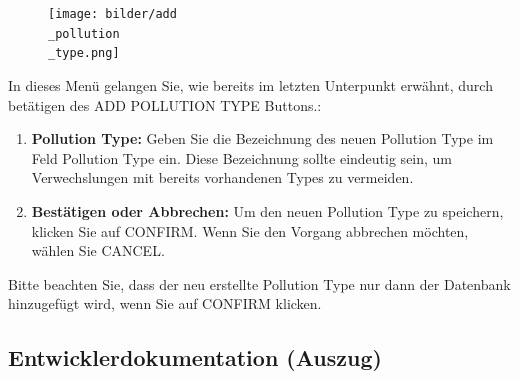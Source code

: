 \documentclass[a4paper,12pt]{article}
\begin{document}
\begin{figure}[h]
\centering
\texttt{[image: bilder/add\\\_pollution\\\_type.png]}
\end{figure}
\noindent In dieses Menü gelangen Sie, wie bereits im letzten Unterpunkt erwähnt, durch betätigen des \glqq ADD POLLUTION TYPE\grqq{} Buttons.:
\begin{enumerate}
        \item \textbf{Pollution Type:} Geben Sie die Bezeichnung des neuen Pollution Type im Feld \glqq Pollution Type\grqq{} ein. Diese Bezeichnung sollte eindeutig sein, um Verwechslungen mit bereits vorhandenen Types zu vermeiden.
        \item \textbf{Bestätigen oder Abbrechen:} Um den neuen Pollution Type zu speichern, klicken Sie auf \glqq CONFIRM\grqq{}. Wenn Sie den Vorgang abbrechen möchten, wählen Sie \glqq CANCEL\grqq{}. \end{enumerate}

\noindent Bitte beachten Sie, dass der neu erstellte Pollution Type nur dann der Datenbank hinzugefügt wird, wenn Sie auf \glqq CONFIRM\grqq{} klicken.


\clearpage
\subsection{Entwicklerdokumentation (Auszug)}
\label{sec:entwicklerdokumentation}
\end{document}
